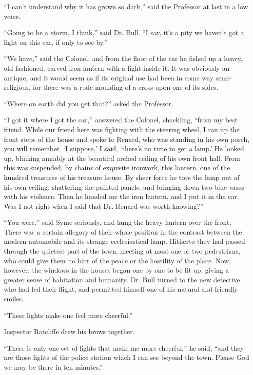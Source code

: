“I can’t understand why it has grown so dark,” said the Professor at last in a low voice.

“Going to be a storm, I think,” said Dr. Bull. “I say, it’s a pity we haven’t got a light on this car, if only to see by.”

“We have,” said the Colonel, and from the floor of the car he fished up a heavy, old-fashioned, carved iron lantern with a light inside it. It was obviously an antique, and it would seem as if its original use had been in some way semi-religious, for there was a rude moulding of a cross upon one of its sides.

“Where on earth did you get that?” asked the Professor.

“I got it where I got the car,” answered the Colonel, chuckling, “from my best friend. While our friend here was fighting with the steering wheel, I ran up the front steps of the house and spoke to Renard, who was standing in his own porch, you will remember. ‘I suppose,’ I said, ‘there’s no time to get a lamp.’ He looked up, blinking amiably at the beautiful arched ceiling of his own front hall. From this was suspended, by chains of exquisite ironwork, this lantern, one of the hundred treasures of his treasure house. By sheer force he tore the lamp out of his own ceiling, shattering the painted panels, and bringing down two blue vases with his violence. Then he handed me the iron lantern, and I put it in the car. Was I not right when I said that Dr. Renard was worth knowing?”

“You were,” said Syme seriously, and hung the heavy lantern over the front. There was a certain allegory of their whole position in the contrast between the modern automobile and its strange ecclesiastical lamp. Hitherto they had passed through the quietest part of the town, meeting at most one or two pedestrians, who could give them no hint of the peace or the hostility of the place. Now, however, the windows in the houses began one by one to be lit up, giving a greater sense of habitation and humanity. Dr. Bull turned to the new detective who had led their flight, and permitted himself one of his natural and friendly smiles.

“These lights make one feel more cheerful.”

Inspector Ratcliffe drew his brows together.

“There is only one set of lights that make me more cheerful,” he said, “and they are those lights of the police station which I can see beyond the town. Please God we may be there in ten minutes.”

